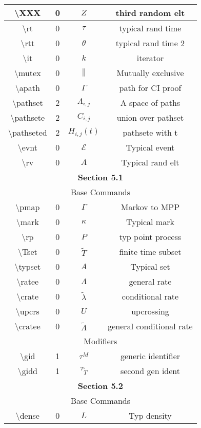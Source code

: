 \documentclass[12pt]{article}
\newcommand{\mc}{\mathcal}
\newcommand{\tbs}{\textbackslash}
\renewcommand{\t}{t}							%
\newcommand{\alt}[1]{\widetilde{#1}}			%
\newcommand{\XXX}{Z}							%
\newcommand{\rt}{\tau}							%
\newcommand{\rtt}{\theta}						%
\renewcommand{\it}{k}							%
\newcommand{\mutex}{\|}							%
\newcommand{\apath}{\Gamma}						%
\newcommand{\pathset}[2]{\Lambda_{#1,#2}}		%
\newcommand{\pathsete}[2]{C_{#1,#2}}			%
\newcommand{\pathseted}[2]{H_{#1,#2}}			%
\newcommand{\evnt}{\mc{E}}						%
\newcommand{\rv}{A}								%
\newcommand{\pmap}{\Gamma}						%
\renewcommand{\mark}{\kappa}					%
\newcommand{\rp}{P}								%
\newcommand{\Tset}{\alt{T}}						%
\newcommand{\typset}{A}							%
\newcommand{\ratee}{\Lambda}					%
\newcommand{\crate}{\alt{\lambda}}				%
\newcommand{\upcrs}{U}							%
\newcommand{\cratee}{\alt{\Lambda}} 			%
\newcommand{\gid}[1]{^{#1}}						%
\newcommand{\gidd}[1]{_{#1}}					%
\newcommand{\dense}{L}							%
\begin{document}
\begin{longtable}{|c|c|c|c|}
\tbs XXX & 0 & \(\XXX\) & third random elt\\\hline
\tbs rt & 0 & \(\rt\) & typical rand time\\\hline
\tbs rtt & 0 & \(\rtt\) & typical rand time 2\\\hline
\tbs it & 0 & \(\it\) & iterator\\\hline
\tbs mutex & 0 & \(\mutex\) & Mutually exclusive\\\hline
\tbs apath & 0 & \(\apath\) & path for CI proof\\\hline
\tbs pathset & 2 & \(\pathset{i}{j}\) & A space of paths\\\hline
\tbs pathsete & 2 & \(\pathsete{i}{j}\) & union over pathset\\\hline
\tbs pathseted & 2 & \(\pathseted{i}{j}(\t)\) & pathsete with t\\\hline
\tbs evnt & 0 & \(\evnt\) & Typical event\\\hline
\tbs rv & 0 & \(\rv\) & Typical rand elt\\\hline
\multicolumn{4}{|c|}{\textbf{Section 5.1}}\\\hline
\multicolumn{4}{|c|}{Base Commands}\\\hline
\tbs pmap & 0 & \(\pmap\) & Markov to MPP	\\\hline
\tbs mark & 0 & \(\mark\) & Typical mark\\\hline
\tbs rp & 0 & \(\rp\) & typ point process\\\hline
\tbs Tset & 0 & \(\Tset\) & finite time subset\\\hline
\tbs typset & 0 & \(\typset\) & Typical set\\\hline
\tbs ratee & 0 & \(\ratee\) & general rate\\\hline
\tbs crate & 0 & \(\crate\) & conditional rate\\\hline
\tbs upcrs & 0 & \(\upcrs\) & upcrossing\\\hline
\tbs cratee & 0 & \(\cratee\) & general conditional rate\\\hline
\multicolumn{4}{|c|}{Modifiers}\\\hline
\tbs gid & 1 & \(\rt\gid{M}\) & generic identifier\\\hline
\tbs gidd & 1 & \(\rt\gidd{\Tset}\) & second gen ident\\\hline
\multicolumn{4}{|c|}{\textbf{Section 5.2}}\\\hline
\multicolumn{4}{|c|}{Base Commands}\\\hline
\tbs dense & 0 & \(\dense\) & Typ density\\\hline

\end{longtable}
\end{document}
